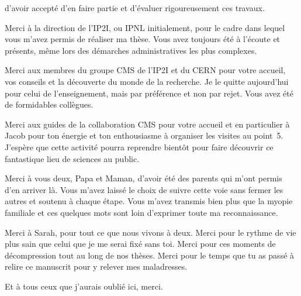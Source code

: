 d'avoir accepté d'en faire partie et d'évaluer rigoureusement ces travaux.
\par
Merci à la direction de l'IP2I, ou IPNL initialement,
pour le cadre dans lequel vous m'avez permis de réaliser ma thèse.
Vous avez toujours été à l'écoute et présents, même lors des démarches administratives les plus complexes.
\par
Merci aux membres du groupe CMS de l'IP2I et du CERN
pour votre accueil, vos conseils et la découverte du monde de la recherche.
Je le quitte aujourd'hui pour celui de l'enseignement,
mais par préférence et non par rejet.
Vous avez été de formidables collègues.
\par
Merci aux guides de la collaboration CMS pour votre accueil
et en particulier à Jacob pour ton énergie et ton enthousiasme
à organiser les visites au point~5.
J'espère que cette activité pourra reprendre bientôt
pour faire découvrir ce fantastique lieu de sciences
au public.
\par
Merci à vous deux, Papa et Maman,
d'avoir été des parents qui m'ont permis d'en arriver là.
Vous m'avez laissé le choix de suivre cette voie sans fermer les autres
et
soutenu à chaque étape.
Vous m'avez transmis bien plus que la myopie familiale
et ces quelques mots sont loin d'exprimer toute ma reconnaissance.
\par
Merci à Sarah,
pour tout ce que nous vivons à deux.
Merci pour le rythme de vie plus sain que celui que je me serai fixé sans toi.
Merci pour ces moments de décompression tout au long de nos thèses.
Merci pour le temps que tu as passé à relire ce manuscrit pour y relever mes maladresses.
\par
Et à tous ceux que j'aurais oublié ici,
merci.